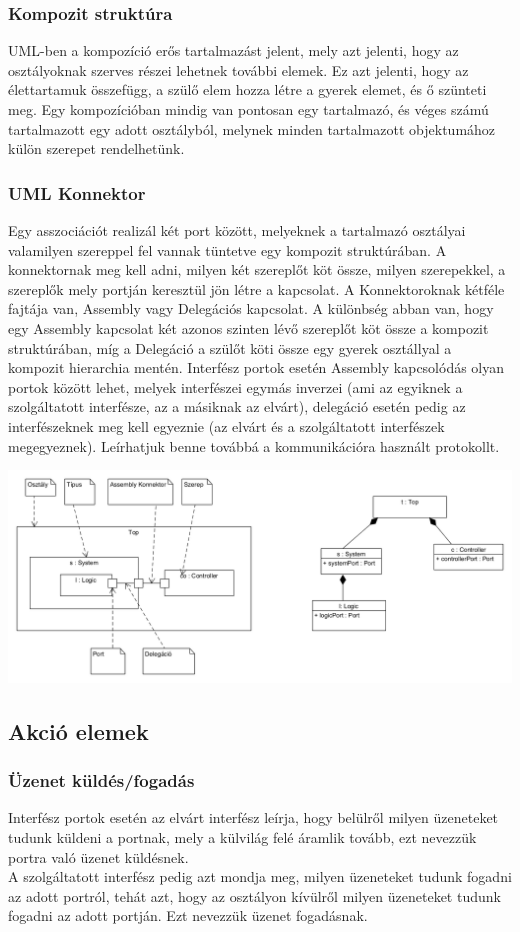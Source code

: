 \documentclass[a4paper,12pt]{report}
\begin{document}
\subsubsection{Kompozit struktúra}
UML-ben a kompozíció erős tartalmazást jelent, mely azt jelenti, hogy az osztályoknak szerves részei lehetnek további elemek. Ez azt jelenti, hogy az élettartamuk összefügg, a szülő elem hozza létre a gyerek elemet, és ő szünteti meg. Egy kompozícióban mindig van pontosan egy tartalmazó, és véges számú tartalmazott egy adott osztályból, melynek minden tartalmazott objektumához külön szerepet rendelhetünk.
\subsubsection{UML Konnektor}
Egy asszociációt realizál két port között, melyeknek a tartalmazó osztályai valamilyen szereppel fel vannak tüntetve egy kompozit struktúrában. A konnektornak meg kell adni, milyen két szereplőt köt össze, milyen szerepekkel, a szereplők mely portján keresztül jön létre a kapcsolat. A Konnektoroknak kétféle fajtája van, Assembly vagy Delegációs kapcsolat. A különbség abban van, hogy egy Assembly kapcsolat két azonos szinten lévő szereplőt köt össze a kompozit struktúrában, míg a Delegáció a szülőt köti össze egy gyerek osztállyal a kompozit hierarchia mentén. Interfész portok esetén Assembly kapcsolódás olyan portok között lehet, melyek interfészei egymás inverzei (ami az egyiknek a szolgáltatott interfésze, az a másiknak az elvárt), delegáció esetén pedig az interfészeknek meg kell egyeznie (az elvárt és a szolgáltatott interfészek megegyeznek). Leírhatjuk benne továbbá a kommunikációra használt protokollt.

\includegraphics[scale=0.8]{composit_stuct.png}

\subsection{Akció elemek}
\subsubsection{Üzenet küldés/fogadás}
Interfész portok esetén az elvárt interfész leírja, hogy belülről milyen üzeneteket tudunk küldeni a portnak, mely a külvilág felé áramlik tovább, ezt nevezzük portra való üzenet küldésnek. \\ A szolgáltatott interfész pedig azt mondja meg, milyen üzeneteket tudunk fogadni az adott portról, tehát azt, hogy az osztályon kívülről milyen üzeneteket tudunk fogadni az adott portján. Ezt nevezzük üzenet fogadásnak.
\end{document}
